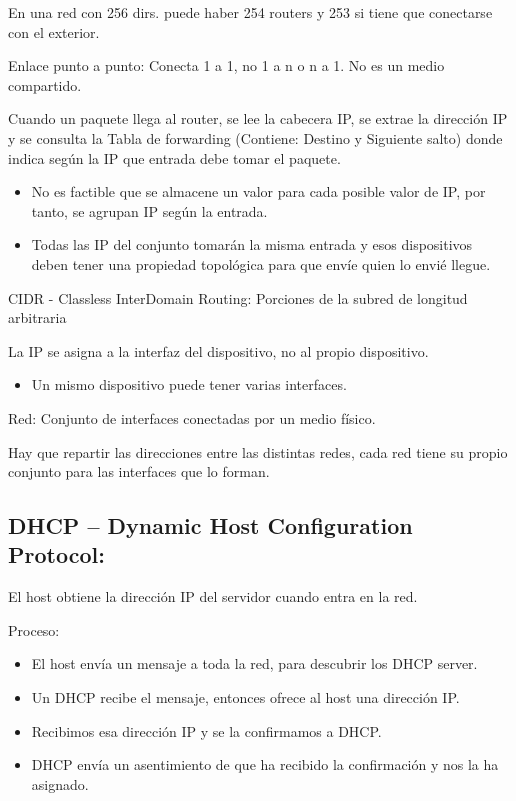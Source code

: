 \documentclass[12pt, twoside, openright]{report} %
\begin{document}
En una red con 256 dirs. puede haber 254 routers y 253 si tiene que
conectarse con el exterior.

Enlace punto a punto: Conecta 1 a 1, no 1 a n o n a 1. No es un
medio compartido.

Cuando un paquete llega al router, se lee la cabecera IP, se extrae
la dirección IP y se consulta la Tabla de forwarding (Contiene:
Destino y Siguiente salto) donde indica según la IP que entrada debe
tomar el paquete.

\begin{itemize}
	\item No es factible que se almacene un valor para cada posible valor de
	      IP, por tanto, se agrupan IP según la entrada.
	\item Todas las IP del conjunto tomarán la misma entrada y esos
	      dispositivos deben tener una propiedad topológica para que envíe quien
	      lo envié llegue.
\end{itemize}

CIDR - Classless InterDomain Routing: Porciones de la subred de
longitud arbitraria

La IP se asigna a la interfaz del dispositivo, no al propio
dispositivo.

\begin{itemize}
	\item Un mismo dispositivo puede tener varias interfaces.
\end{itemize}

Red: Conjunto de interfaces conectadas por un medio físico.


Hay que repartir las direcciones entre las distintas redes, cada red
tiene su propio conjunto para las interfaces que lo forman.



\subsection{DHCP -- Dynamic Host Configuration
	Protocol:}

El host obtiene la dirección IP del servidor cuando entra en la red.

Proceso:

\begin{itemize}
	\item El host envía un mensaje a toda la red, para descubrir los DHCP
	      server.
	\item Un DHCP recibe el mensaje, entonces ofrece al host una dirección IP.
	\item Recibimos esa dirección IP y se la confirmamos a DHCP.
	\item DHCP envía un asentimiento de que ha recibido la confirmación y nos
	      la ha asignado.
\end{itemize}
\end{document}
